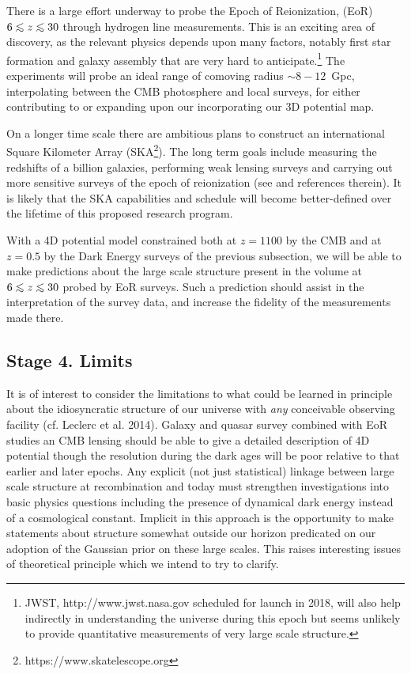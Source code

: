 \documentclass[psfig,11pt]{article}
\def\lo{\mathrel{\raise.3ex\hbox{$<$}\mkern-14mu\lower0.6ex\hbox{$\sim$}}}
\begin{document}
There is a large effort underway to probe the Epoch of Reionization, (EoR) $6\lo z\lo30$ through hydrogen line measurements. This is an exciting area of discovery, as the relevant physics depends upon many factors, notably first star formation and galaxy assembly that are very hard to anticipate.\footnote{JWST, http://www.jwst.nasa.gov scheduled for launch in 2018, will also help indirectly in understanding the universe during this epoch but seems unlikely to provide quantitative measurements of very large scale structure.} The experiments will probe an ideal range of comoving radius $\sim8-12$~Gpc, interpolating between the CMB photosphere and local surveys,  for either contributing to or expanding upon our incorporating our 3D potential map.

On a longer time scale there are ambitious plans to construct an international Square Kilometer Array (SKA\footnote{https://www.skatelescope.org}). The long term goals include measuring the redshifts of a billion galaxies, performing weak lensing surveys and carrying out more sensitive surveys of the epoch of reionization (see  \cite{SKACosmology} and references therein). It is likely that the SKA capabilities and schedule will become better-defined over the lifetime of this proposed research program.

With a 4D potential model constrained both at $z=1100$ by the CMB and at $z=0.5$ by the Dark Energy surveys of the previous subsection, we will be able to make predictions about the large scale structure present in the volume at $6\lo z\lo30$ probed by EoR surveys. Such a prediction should assist in the interpretation of the survey data, and increase the fidelity of the measurements made there.


\subsection{Stage 4. Limits}

It is of interest to consider the limitations to what could be learned in principle about the idiosyncratic structure of our universe with {\it any} conceivable observing facility (cf. Leclerc et al. 2014). Galaxy and quasar survey combined with EoR studies an CMB lensing should be able to give a detailed description of 4D potential though the resolution during the dark ages will be poor relative to that earlier and later epochs. Any explicit (not just statistical) linkage between large scale structure at recombination and today must strengthen investigations into basic physics questions including the presence of dynamical dark energy instead of a cosmological constant. Implicit in this approach is the opportunity to make statements about structure somewhat outside our horizon predicated on our adoption of the Gaussian prior on these large scales. This raises interesting issues of theoretical principle which we intend to try to clarify.
\end{document}
